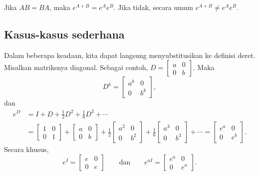 \begin{theorem}
Jika $AB = BA$, maka $e^{A+B} = e^Ae^B$.  Jika tidak,
secara umum $e^{A+B} \neq e^Ae^B$.
\end{theorem}

\subsection{Kasus-kasus sederhana}

Dalam beberapa keadaan, kita dapat langsung menyubstitusikan ke definisi deret.
Misalkan matriksnya diagonal.
Sebagai contoh,
$D = \left[ \begin{smallmatrix} a & 0 \\ 0 & b \end{smallmatrix} \right]$.
Maka 
\begin{equation*}
D^k = \begin{bmatrix} a^k & 0 \\ 0 & b^k \end{bmatrix} ,
\end{equation*}
dan
\begin{equation*}
\begin{split}
e^D & =
I + D + \frac{1}{2} D^2 + 
\frac{1}{6} D^3 + \cdots
\\
&=
\begin{bmatrix} 1 & 0 \\ 0 & 1 \end{bmatrix} +
\begin{bmatrix} a & 0 \\ 0 & b \end{bmatrix} +
\frac{1}{2}
\begin{bmatrix} a^2 & 0 \\ 0 & b^2 \end{bmatrix} +
\frac{1}{6}
\begin{bmatrix} a^3 & 0 \\ 0 & b^3 \end{bmatrix} + \cdots
=
\begin{bmatrix} e^a & 0 \\ 0 & e^b \end{bmatrix} .
\end{split}
\end{equation*}
Secara khusus,
\begin{equation*}
e^I = \begin{bmatrix} e & 0\\ 0 & e \end{bmatrix}
\qquad \text{dan} \qquad
e^{aI} = \begin{bmatrix} e^a & 0\\ 0 & e^a \end{bmatrix}.
\end{equation*}

